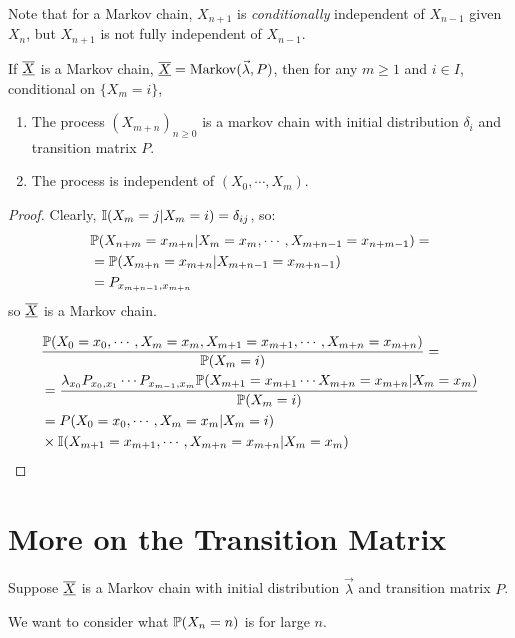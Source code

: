 \documentclass[../Main.tex]{subfiles}
\begin{document}
Note that for a Markov chain, $X_{n+1}$ is \textit{conditionally} independent of $X_{n-1}$ given $X_n$, but $X_{n+1}$ is not fully independent of $X_{n-1}$.
\begin{theorem}
    If $\chain{X}$ is a Markov chain, $\chain{X} = \text{Markov}(\vec{\lambda}, P)$, then for any $m \geq 1$ and $i \in I$, conditional on $\{X_m = i\}$,
    \begin{enumerate}
        \item The process $(X_{m + n})_{n \geq 0}$ is a markov chain with initial distribution $\delta_i$ and transition matrix $P$.
        \item The process is independent of $(X_0, \cdots, X_m)$.
    \end{enumerate}
    \label{thmMarkovProperty}
\end{theorem}
\begin{proof}
    Clearly, $\ind{X_m = j | X_m = i} = \delta_{ij}$, so:
    \begin{align*}
        &\P(X_{n + m} = x_{m + n} | X_m = x_m, \cdots, X_{m + n - 1} = x_{n + m - 1}) = \\
        &= \P(X_{m + n} = x_{m + n} | X_{m + n - 1} = x_{m + n - 1}) \\
        &= \Pmat{m + n - 1}{m + n}
    \end{align*}
    so $\chain{X}$ is a Markov chain.

    \begin{align*}
        &\frac{\P(X_0 = x_0, \cdots, X_m = x_m, X_{m + 1} = x_{m + 1}, \cdots, X_{m + n} = x_{m + n})}{\P(X_m = i)} = \\
        &= \frac{\lambda_{x_0} \Pmat{0}{1} \cdots \Pmat{m-1}{m} \P(X_{m + 1} = x_{m + 1} \cdots X_{m + n} = x_{m + n} | X_m = x_m)}{\P(X_m = i)} \\
        &= P(X_0 = x_0, \cdots, X_m = x_m | X_m = i) \\
        &\times \ind{X_{m + 1} = x_{m + 1}, \cdots, X_{m + n} = x_{m + n} | X_m = x_m}
    \end{align*}
\end{proof}
\section{More on the Transition Matrix}
Suppose $\chain{X}$ is a Markov chain with initial distribution $\vec{\lambda}$ and transition matrix $P$.

We want to consider what $\P(X_n = n)$ is for large $n$.
\end{document}
